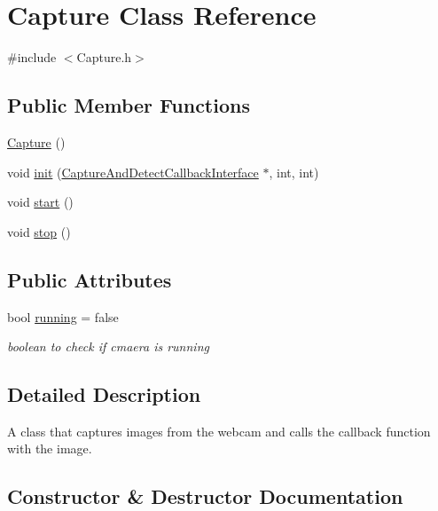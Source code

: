 \hypertarget{classCapture}{}\section{Capture Class Reference}
\label{classCapture}


{\ttfamily \#include $<$Capture.\+h$>$}

\subsection*{Public Member Functions}
\begin{DoxyCompactItemize}
\item 
\hyperlink{classCapture_a97036b5d271238bd4852da79a0091b57}{Capture} ()
\item 
void \hyperlink{classCapture_a1c661ca1dca730fae534cb8f54ff6ef5}{init} (\hyperlink{classCaptureAndDetectCallbackInterface}{Capture\+And\+Detect\+Callback\+Interface} $\ast$, int, int)
\item 
void \hyperlink{classCapture_a2ffe4eeac4caa296f4fcc75cc82c1436}{start} ()
\item 
void \hyperlink{classCapture_ab632f1927461a909b18cce71ec96f76d}{stop} ()
\end{DoxyCompactItemize}
\subsection*{Public Attributes}
\begin{DoxyCompactItemize}
\item 
bool \hyperlink{classCapture_a4120483ac2f664e14a80ec5dcd9915cb}{running} = false
\begin{DoxyCompactList}\small\item\em boolean to check if cmaera is running \end{DoxyCompactList}\end{DoxyCompactItemize}


\subsection{Detailed Description}
A class that captures images from the webcam and calls the callback function with the image. 

\subsection{Constructor \& Destructor Documentation}
\mbox{\label{classCapture_a97036b5d271238bd4852da79a0091b57}} 
